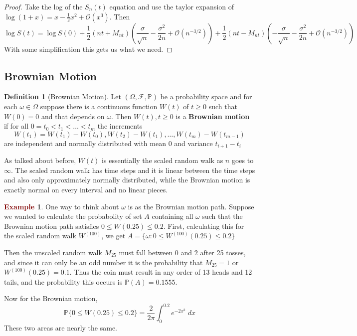 \documentclass[11pt]{article}
\theoremstyle{definition}
\theoremstyle{definition}
\theoremstyle{definition}
\newtheorem{definition}{\textcolor{OliveGreen}{Definition}}
\newtheorem{ex}{\textcolor{Maroon}{Example}}
\theoremstyle{remark}
\begin{document}
\begin{proof}
    Take the log of the $S_n(t)$ equation and use the taylor expansion of $\log(1 + x) = x - \frac{1}{2}x^2 + \mathcal{O}(x^3)$.
    Then
    \[
    \log S(t) = \log S(0) + \frac{1}{2}(nt + M_{nt})\left(\frac{\sigma}{\sqrt{n}} - \frac{\sigma^2}{2n} + \mathcal{O}(n^{-3/2})\right)
    + \frac{1}{2}(nt - M_{nt})\left(-\frac{\sigma}{\sqrt{n}} - \frac{\sigma^2}{2n} + \mathcal{O}(n^{-3/2})\right)
    \]
    With some simplification this gets us what we need. \qedhere
\end{proof}


\subsection{Brownian Motion}

\begin{definition}[Brownian Motion]
    Let $(\Omega, \mathcal{F}, \mathbb{P})$ be a probability space and for each $\omega \in \Omega$ suppose there
    is a continuous function $W(t)$ of $t \geq 0$ such that $W(0) = 0$ and that depends on $\omega$. Then
    $W(t), t \geq 0$ is a \textbf{Brownian motion} if for all $0 = t_0 < t_1 < \dots < t_m$ the increments
    \[
        W(t_1) = W(t_1) - W(t_0), W(t_2) - W(t_1), \dots, W(t_m) - W(t_{m - 1})
    \] 
    are independent and normally distributed with mean $0$ and variance $t_{i + 1} - t_i$  
\end{definition}

As talked about before, $W(t)$ is essentially the scaled random walk as $n$ goes to $\infty$. The scaled random walk
has time steps and it is linear between the time steps and also only approximately normally distributed, while the
Brownian motion is exactly normal on every interval and no linear pieces.   

\begin{ex}
    One way to think about $\omega$ is as the Brownian motion path. Suppose we wanted to calculate the probabolity of set
    $A$ containing all $\omega$ such that the Brownian motion path satisfies $0 \leq W(0.25) \leq 0.2$. 
    First, calculating this for the scaled random walk $W^{(100)}$, we get $A = \{\omega : 0 \leq W^{(100)}(0.25) \leq 0.2\} $  

    Then the unscaled random walk $M_{25}$ must fall between $0$ and $2$ after 25 tosses, and since it can only
    be an odd number it is the probability that $M_{25} = 1$ or $W^{(100)}(0.25) = 0.1$. Thus the coin must result
    in any order of 13 heads and 12 tails, and the probability this occurs is $\mathbb{P}(A) = 0.1555$.
    
    Now for the Brownian motion, 
    \[
        \mathbb{P}\{0 \leq W(0.25) \leq 0.2\} = \frac{2}{2\pi}\int_{0}^{0.2} e^{-2 x^2} \; dx
    \] 
    These two areas are nearly the same.
\end{ex}
\end{document}

